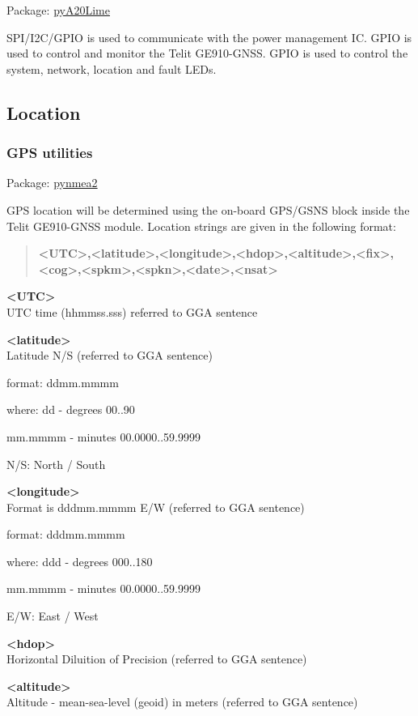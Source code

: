 Package:	\href{https://pypi.python.org/pypi/pyA20Lime}{pyA20Lime}

SPI/I2C/GPIO is used to communicate with the power management IC. GPIO is used to control and monitor the Telit GE910-GNSS. GPIO is used to control the system, network, location and fault LEDs.
    
\subsection{Location}

\subsubsection{GPS utilities}

Package:	\href{https://github.com/Knio/pynmea2}{pynmea2}

GPS location will be determined using the on-board GPS/GSNS block inside the Telit GE910-GNSS module. Location strings are given in the following format:
\begin{quote}
\textbf{<UTC>,<latitude>,<longitude>,<hdop>,<altitude>,<fix>,<cog>,<spkm>,<spkn>,<date>,<nsat>}
\end{quote} 

\textbf{<UTC>} \\
UTC time (hhmmss.sss) referred to GGA sentence

\textbf{<latitude>} \\
Latitude N/S (referred to GGA sentence)
	
format:
ddmm.mmmm
					
where:
dd - degrees
00..90

mm.mmmm - minutes
00.0000..59.9999

N/S: North / South 

\textbf{<longitude>} \\
Format is dddmm.mmmm E/W (referred to GGA sentence) 

format:
dddmm.mmmm

where:
ddd - degrees						
000..180

mm.mmmm - minutes				
00.0000..59.9999

E/W: East / West

\textbf{<hdop>} \\
Horizontal Diluition of Precision (referred to GGA sentence) 

\textbf{<altitude>} \\
Altitude - mean-sea-level (geoid) in meters (referred to GGA sentence)


